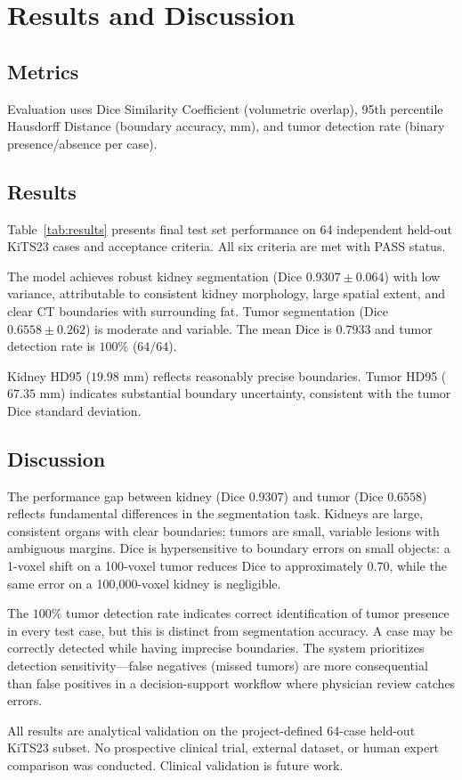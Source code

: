 ﻿\section{Results and Discussion}

\subsection{Metrics}

Evaluation uses Dice Similarity Coefficient (volumetric overlap), 95th percentile Hausdorff Distance (boundary accuracy, mm), and tumor detection rate (binary presence/absence per case).

\subsection{Results}



Table~\ref{tab:results} presents final test set performance on 64 independent held-out KiTS23 cases and acceptance criteria. All six criteria are met with PASS status.

The model achieves robust kidney segmentation (Dice $0.9307 \pm 0.064$) with low variance, attributable to consistent kidney morphology, large spatial extent, and clear CT boundaries with surrounding fat. Tumor segmentation (Dice $0.6558 \pm 0.262$) is moderate and variable. The mean Dice is $0.7933$ and tumor detection rate is $100\%$ ($64/64$).

Kidney HD95 ($19.98$ mm) reflects reasonably precise boundaries. Tumor HD95 ($67.35$ mm) indicates substantial boundary uncertainty, consistent with the tumor Dice standard deviation.

\subsection{Discussion}

The performance gap between kidney (Dice $0.9307$) and tumor (Dice $0.6558$) reflects fundamental differences in the segmentation task. Kidneys are large, consistent organs with clear boundaries; tumors are small, variable lesions with ambiguous margins. Dice is hypersensitive to boundary errors on small objects: a 1-voxel shift on a 100-voxel tumor reduces Dice to approximately 0.70, while the same error on a 100,000-voxel kidney is negligible.

The $100\%$ tumor detection rate indicates correct identification of tumor presence in every test case, but this is distinct from segmentation accuracy. A case may be correctly detected while having imprecise boundaries. The system prioritizes detection sensitivity---false negatives (missed tumors) are more consequential than false positives in a decision-support workflow where physician review catches errors.

All results are analytical validation on the project-defined 64-case held-out KiTS23 subset. No prospective clinical trial, external dataset, or human expert comparison was conducted. Clinical validation is future work.
